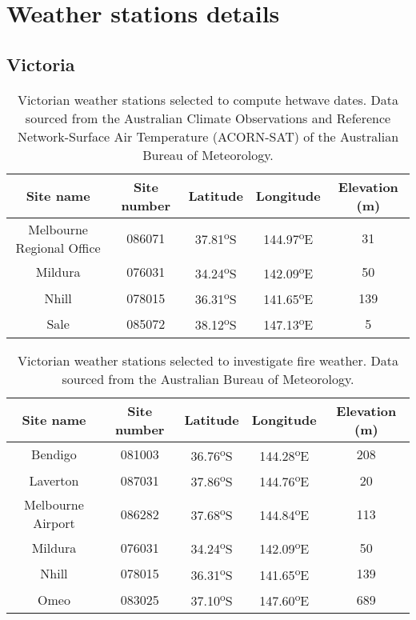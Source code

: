 \chapter{Weather stations details}

\newpage{}


\section{Victoria}

\begin{table}[h]
\caption{Victorian weather stations selected to compute hetwave dates. Data
sourced from the Australian Climate Observations and Reference Network-Surface
Air Temperature (ACORN-SAT) of the Australian Bureau of Meteorology.
\label{tab:Victorian weather stations selected to compute hetwave dates} }


\begin{centering}
\begin{tabular}{|c|c|c|c|c|}
\hline 
\textbf{Site name} & \textbf{Site number} & \textbf{Latitude} & \textbf{Longitude} & \textbf{Elevation (m)}\tabularnewline
\hline 
\hline 
Melbourne Regional Office & 086071 & 37.81\textsuperscript{o}S & 144.97\textsuperscript{o}E & 31\tabularnewline
\hline 
Mildura & 076031 & 34.24\textsuperscript{o}S & 142.09\textsuperscript{o}E & 50\tabularnewline
\hline 
Nhill & 078015 & 36.31\textsuperscript{o}S & 141.65\textsuperscript{o}E & 139\tabularnewline
\hline 
Sale & 085072 & 38.12\textsuperscript{o}S & 147.13\textsuperscript{o}E & 5\tabularnewline
\hline 
\end{tabular}
\par\end{centering}

\end{table}


\begin{table}[h]


\caption[Victorian weather stations selected to investigate fire weather]{Victorian weather stations selected to investigate fire weather. Data
sourced from the Australian Bureau of Meteorology. \label{tab:Victorian weather stations selected to investigate fire weather} }


\centering{}%
\begin{tabular}{|c|c|c|c|c|}
\hline 
\textbf{Site name} & \textbf{Site number} & \textbf{Latitude} & \textbf{Longitude} & \textbf{Elevation (m)}\tabularnewline
\hline 
\hline 
Bendigo & 081003 & 36.76\textsuperscript{o}S & 144.28\textsuperscript{o}E & 208\tabularnewline
\hline 
Laverton & 087031 & 37.86\textsuperscript{o}S & 144.76\textsuperscript{o}E & 20\tabularnewline
\hline 
Melbourne Airport & 086282 & 37.68\textsuperscript{o}S & 144.84\textsuperscript{o}E & 113\tabularnewline
\hline 
Mildura & 076031 & 34.24\textsuperscript{o}S & 142.09\textsuperscript{o}E & 50\tabularnewline
\hline 
Nhill & 078015 & 36.31\textsuperscript{o}S & 141.65\textsuperscript{o}E & 139\tabularnewline
\hline 
Omeo & 083025 & 37.10\textsuperscript{o}S & 147.60\textsuperscript{o}E & 689\tabularnewline
\hline 
\end{tabular}
\end{table}



